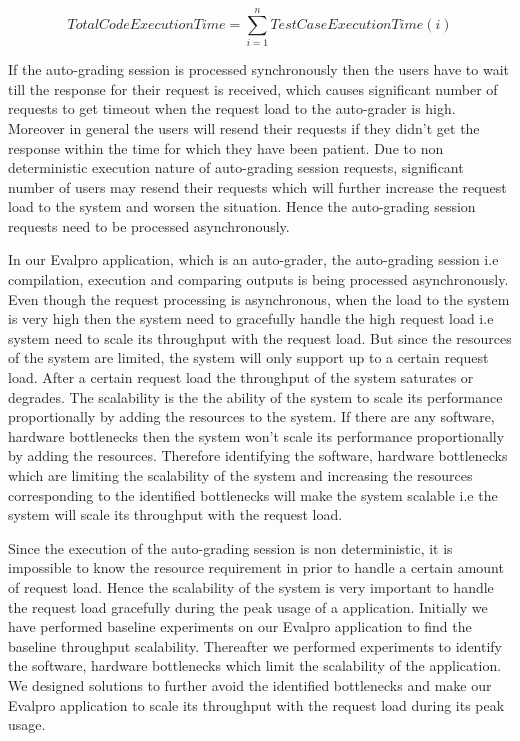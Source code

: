 \documentclass[sigconf]{acmart}
\begin{document}
\begin{equation}
  Total Code Execution Time=\sum_{i=1}^{n} Test Case Execution Time(i)
  \label{eq:test_case_execution}
\end{equation}

If the auto-grading session is processed synchronously then the users have to wait till the response for their request is received, which causes significant number of requests to get timeout when the request load to the auto-grader is high.  Moreover in general the users will resend their requests if they didn't get the response within the time for which they have been patient. Due to non deterministic execution nature of auto-grading session requests, significant number of users may resend their requests which will further increase the request load to the system and worsen the situation. Hence the auto-grading session requests need to be processed asynchronously.


In our Evalpro  application, which is an auto-grader, the auto-grading session i.e compilation, execution and comparing outputs is being processed asynchronously. Even though the request processing is asynchronous, when the load to the system is very high then the system need to gracefully handle the high request load i.e system need to scale its throughput with the request load.  But since the resources of the system are limited, the system will only support up to a certain request load. After a certain request load the throughput of the system  saturates or degrades. The scalability is the the ability of the system to scale its performance proportionally by adding the resources to the system. If there are any software, hardware bottlenecks then the system won't scale its performance proportionally by adding the resources. Therefore identifying the software, hardware bottlenecks which are limiting the scalability of the system and increasing the resources corresponding to the identified bottlenecks will make the system scalable i.e the system will scale its throughput with the request load. 

Since the execution of the auto-grading session is non deterministic, it is impossible to know the resource requirement in prior to handle a certain amount of request load. Hence the scalability of the system is very important to handle the request load gracefully during the peak usage of a application. Initially we have performed baseline experiments on our Evalpro application to find the baseline throughput scalability. Thereafter we performed experiments to identify the software, hardware bottlenecks which limit the scalability of the application. We designed solutions to further avoid the identified bottlenecks and make our Evalpro application to scale its throughput with the request load during its peak usage.
\end{document}

